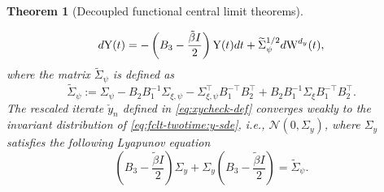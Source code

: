 \documentclass[11pt]{article}
\theoremstyle{plain}
\newtheorem{thm}{Theorem}[section]
\theoremstyle{definition}
\def\invdiffslow{\tilde{\beta}}
\def\ermW{{\textnormal{W}}}
\def\ermY{{\textnormal{Y}}}
\def\mI{{\bm{I}}}
\def\NM{{\mathcal N}}
\newcommand{\ycheck}{{\check{y}}}
\def\mI{{I}}
\begin{document}
\begin{thm}[Decoupled functional central limit theorems]
\begin{enumerate}[(i)]
		\begin{equation}\label{eq:fclt-twotime:y-sde}
			d \ermY(t) = - \left(B_3 - \frac{\invdiffslow \mI}{2}  \right) \ermY(t) dt + \widetilde{\Sigma}_{\psi}^{1/2} d \ermW^{d_y}(t),
		\end{equation}
		where the matrix $\widetilde{\Sigma}_{\psi}$ is defined as 
		\begin{equation}\label{eq:cov-z}
			\widetilde{\Sigma}_{\psi} := \Sigma_{\psi} - B_2 B_1^{-1} \Sigma_{\xi,\psi} - \Sigma_{\xi, \psi}^\top B_1^{-\top} B_2^\top + B_2 B_1^{-1} \Sigma_{\xi} B_1^{-\top} B_2^\top.
		\end{equation}
		The rescaled iterate $ \ycheck_{n}$ defined in \eqref{eq:xycheck-def} converges weakly to the invariant distribution of \eqref{eq:fclt-twotime:y-sde}, i.e., $\NM(0, \Sigma_y)$, where $\Sigma_y$ satisfies the following Lyapunov equation
		\begin{equation}\label{eq:fclt-twotime:y-var}
			\left(B_3 - \frac{\invdiffslow \mI}{2} \right) \Sigma_y + \Sigma_y \left( B_3 - \frac{\invdiffslow \mI}{2} \right) = \widetilde{\Sigma}_{\psi}.
		\end{equation}
	\end{enumerate}
\end{thm}
\end{document}
